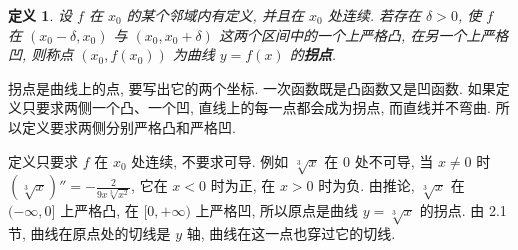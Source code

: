 \documentclass[UTF8,openany]{ctexbook}
\theoremstyle{chinesetextbook}
\newtheorem{definition}{定义}[section]
\begin{document}
\begin{definition}\label{def:c2-10-inflection}
设 $f$ 在 $x_0$ 的某个邻域内有定义, 并且在 $x_0$ 处连续. 若存在 $\delta>0$, 使 $f$ 在 $(x_0-\delta,x_0)$ 与 $(x_0,x_0+\delta)$ 这两个区间中的一个上严格凸, 在另一个上严格凹, 则称点 $(x_0,f(x_0))$ 为曲线 $y=f(x)$ 的\textbf{拐点}.
\end{definition}
拐点是曲线上的点, 要写出它的两个坐标. 一次函数既是凸函数又是凹函数. 如果定义只要求两侧一个凸、一个凹, 直线上的每一点都会成为拐点, 而直线并不弯曲. 所以定义要求两侧分别严格凸和严格凹.

定义只要求 $f$ 在 $x_0$ 处连续, 不要求可导. 例如 $\sqrt[3]x$ 在 $0$ 处不可导, 当 $x\ne0$ 时 $\displaystyle(\sqrt[3]x)''=-\frac2{9x\sqrt[3]{x^2}}$, 它在 $x<0$ 时为正, 在 $x>0$ 时为负. 由推论, $\sqrt[3]x$ 在 $(-\infty,0]$ 上严格凸, 在 $[0,+\infty)$ 上严格凹, 所以原点是曲线 $y=\sqrt[3]x$ 的拐点. 由 2.1 节, 曲线在原点处的切线是 $y$ 轴, 曲线在这一点也穿过它的切线.
\end{document}
